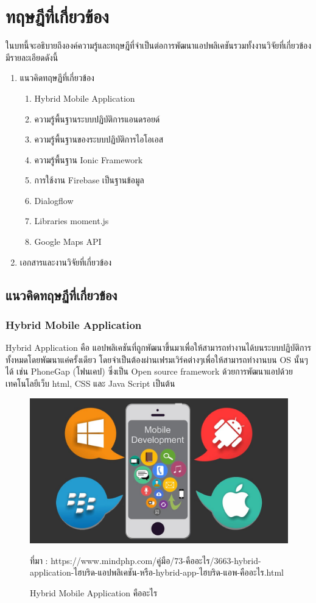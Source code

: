 \chapter{ทฤษฎีที่เกี่ยวข้อง}

ในบทนี้จะอธิบายถึงองค์ความรู้และทฤษฎีที่จำเป็นต่อการพัฒนาแอปพลิเคชันรวมทั้งงานวิจัยที่เกี่ยวข้อง มีรายละเอียดดังนี้

\begin{enumerate}[label=2.\arabic*]
	\item แนวคิดทฤษฏีที่เกี่ยวข้อง
	\begin{enumerate}[label=2.1.\arabic*]
		\item Hybrid Mobile Application
		\item ความรู้พื้นฐานระบบปฏิบัติการแอนดรอยด์
		\item ความรู้พื้นฐานของระบบปฏิบัติการไอโอเอส
		\item ความรู้พื้นฐาน Ionic Framework
		\item การใช้งาน Firebase เป็นฐานข้อมูล
		\item Dialogflow
		\item Libraries moment.js
		\item Google Maps API
	\end{enumerate}
	\item เอกสารและงานวิจัยที่เกี่ยวข้อง
\end{enumerate}

\section{แนวคิดทฤษฏีที่เกี่ยวข้อง}

\subsection{Hybrid Mobile Application}
Hybrid Application คือ แอปพลิเคชันที่ถูกพัฒนาขึ้นมาเพื่อให้สามารถทำงานได้บนระบบปฏิบัติการทั้งหมดโดยพัฒนาแค่ครั้งเดียว 
โดยจำเป็นต้องผ่านเฟรมเวิร์คต่างๆเพื่อให้สามารถทำงานบน OS นั้นๆได้ เช่น PhoneGap (โฟนเคป) ซึ่งเป็น Open source framework 
ด้วยการพัฒนาแอปด้วยเทคโนโลยีเว็บ html, CSS และ Java Script เป็นต้น 

\begin{figure}[H]
	\centering
	\includegraphics[width=0.5\columnwidth]{Figures/2/hybrid}
	\caption{Hybrid Mobile Application คืออะไร}{ที่มา :  https://www.mindphp.com/คู่มือ/73-คืออะไร/3663-hybrid-application-ไฮบริด-แอปพลิเคชัน-หรือ-hybrid-app-ไฮบริด-แอพ-คืออะไร.html}
	\label{Fig:hybrid}
\end{figure}

